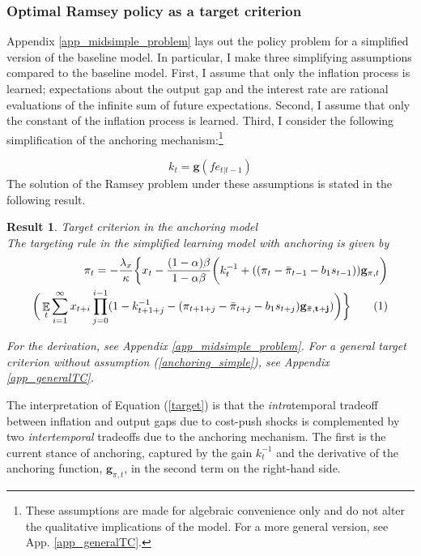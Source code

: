 \documentclass[11pt]{article}
\renewcommand{\[}{\begin{equation}}
\renewcommand{\]}{\end{equation}}
\newtheorem{result}{Result}
\DeclareMathOperator{\E}{\mathbb{E}}
\newcommand\numberthis{\addtocounter{equation}{1}\tag{\theequation}} %
\begin{document}
\subsubsection{Optimal Ramsey policy as a target criterion}

Appendix \ref{app_midsimple_problem} lays out the policy problem for a simplified version of the baseline model. In particular, I make three simplifying assumptions compared to the baseline model. First, I assume that only the  inflation process is learned; expectations about the output gap and the interest rate are rational evaluations of the infinite sum of future expectations. Second, I assume that only the constant of the inflation process is learned. Third, I consider the following simplification of the anchoring mechanism:\footnote{These assumptions are made for algebraic convenience only and do not alter the qualitative implications of the model. For a more general version, see App. \ref{app_generalTC}.}

\begin{equation}
k_t = \mathbf{g}(fe_{t|t-1}) \label{anchoring_simple}
\end{equation}
The solution of the Ramsey problem under these assumptions is stated in the following result.

\begin{result} Target criterion in the anchoring model \\
The targeting rule in the simplified learning model with anchoring is given by
\begin{align*}
\pi_t  = -\frac{\lambda_x}{\kappa}\bigg\{x_t - \frac{(1-\alpha)\beta}{1-\alpha\beta} \bigg(k_t^{-1}+((\pi_t - \bar{\pi}_{t-1}-b_1 s_{t-1}))\mathbf{g}_{\pi,t} \bigg) \\
\bigg(\E_t\sum_{i=1}^{\infty}x_{t+i}\prod_{j=0}^{i-1}(1-k_{t+1+j}^{-1} - (\pi_{t+1+j} - \bar{\pi}_{t+j}-b_1 s_{t+j})\mathbf{g_{\bar{\pi},t+j}}) \bigg)
\bigg\} \numberthis \label{target}
\end{align*}

For the derivation, see Appendix \ref{app_midsimple_problem}. For a general target criterion without assumption (\ref{anchoring_simple}), see Appendix \ref{app_generalTC}. 
\label{result_target_anchoring}
\end{result}
The interpretation of Equation (\ref{target}) is that the \emph{intra}temporal tradeoff between inflation and output gaps due to cost-push shocks is complemented by two \emph{intertemporal} tradeoffs due to the anchoring mechanism. The first is the current stance of anchoring, captured by the gain $k_t^{-1}$ and the derivative of the anchoring function, $\mathbf{g}_{\pi,t}$, in the second term on the right-hand side. 
\end{document}
